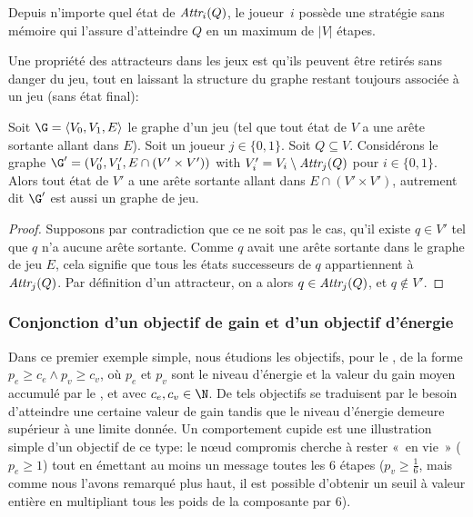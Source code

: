 \begin{lemma}
Depuis n'importe quel état de $\textit{Attr}_{i}(Q)$, le joueur~$i$ possède une stratégie sans mémoire qui l'assure d'atteindre $Q$ en un maximum de $|V|$ étapes.
\end{lemma}

Une propriété des attracteurs dans les jeux est qu'ils peuvent être retirés sans danger du jeu, tout en laissant la structure du graphe restant toujours associée à un jeu (\cad sans état final):
\begin{lemma}\label{tj:lem:removeattr}
Soit $\G = \langle V_0, V_1, E\rangle$ le graphe d'un jeu (\cad tel que tout état de $V$ a une arête sortante allant dans $E$).
Soit un joueur $j \in \{0,1\}$.
Soit $Q \subseteq V$.
Considérons le graphe $\G' = (V_0', V_1', E \cap (V' \times V'))$ with $V_i' = V_i \setminus \textit{Attr}_{j}(Q)$ pour $i \in \{0,1\}$.
Alors tout état de $V'$ a une arête sortante allant dans $E \cap (V' \times V')$, autrement dit $\G'$ est aussi un graphe de jeu.
\end{lemma}

\begin{proof}
Supposons par contradiction que ce ne soit pas le cas, \cad qu'il existe $q \in V'$ tel que $q$ n'a aucune arête sortante.
Comme $q$ avait une arête sortante dans le graphe de jeu $E$, cela signifie que tous les états successeurs de $q$ appartiennent à $\textit{Attr}_{j}(Q)$.
Par définition d'un attracteur, on a alors $q \in \textit{Attr}_{j}(Q)$, et $q \notin V'$.
\end{proof}

\subsubsection{Conjonction d'un objectif de gain et d'un objectif d'énergie}

Dans ce premier exemple simple, nous étudions les objectifs, pour le \jo, de la forme $p_e \geq c_e \wedge p_v \geq c_v$, où $p_e$ et $p_v$ sont le niveau d'énergie et la valeur du gain moyen accumulé par le \jo, et avec $c_e,c_v \in \N$.
De tels objectifs se traduisent par le besoin d'atteindre une certaine valeur de gain tandis que le niveau d'énergie demeure supérieur à une limite donnée.
Un comportement cupide est une illustration simple d'un objectif de ce type: le nœud compromis cherche à rester « en vie » ($p_e \geq 1$) tout en émettant au moins un message toutes les $6$ étapes ($p_v \geq \frac1{6}$, mais comme nous l'avons remarqué plus haut, il est possible d'obtenir un seuil à valeur entière en multipliant tous les poids de la composante par $6$).

